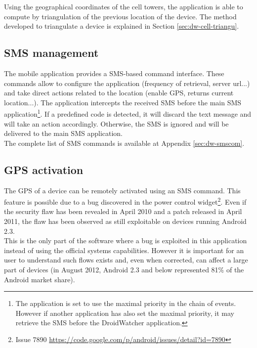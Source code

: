 Using the geographical coordinates of the cell towers, the application is able to compute by triangulation of the previous location of the device.
The method developed to triangulate a device is explained in Section \ref{sec:dw-cell-triangu}.

\subsection{SMS management}
\label{sec:dw-sms-manag}

The mobile application provides a SMS-based command interface.
These commands allow to configure the application (frequency of retrieval, server url...) and take direct actions related to the location (enable GPS, returns current location...).
The application intercepts the received SMS before the main SMS application\footnote{The application is set to use the maximal priority in the chain of events. However if another application has also set the maximal priority, it may retrieve the SMS before the DroidWatcher application.}.
If a predefined code is detected, it will discard the text message and will take an action accordingly.
Otherwise, the SMS is ignored and will be delivered to the main SMS application.\\

The complete list of SMS commands is available at Appendix \ref{sec:dw-smscom}.

\subsection{GPS activation}
\label{sec:dw-gps-bug}

The GPS of a device can be remotely activated using an SMS command.
This feature is possible due to a bug discovered in the power control widget\footnote{Issue 7890 \url{https://code.google.com/p/android/issues/detail?id=7890}}.
Even if the security flaw has been revealed in April 2010 and a patch released in April 2011, the flaw has been observed as still exploitable on devices running Android 2.3.\\

This is the only part of the software where a bug is exploited in this application instead of using the official systems capabilities.
However it is important for an user to understand such flows exists and, even when corrected, can affect a large part of devices (in August 2012, Android 2.3 and below represented 81\% of the Android market share).



